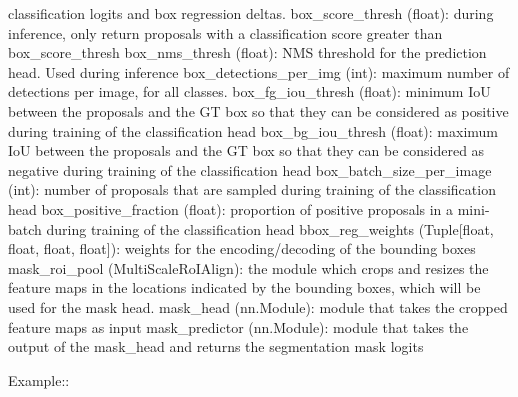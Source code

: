 \begin{DoxyVerb}
        classification logits and box regression deltas.
    box_score_thresh (float): during inference, only return proposals with a classification score
        greater than box_score_thresh
    box_nms_thresh (float): NMS threshold for the prediction head. Used during inference
    box_detections_per_img (int): maximum number of detections per image, for all classes.
    box_fg_iou_thresh (float): minimum IoU between the proposals and the GT box so that they can be
        considered as positive during training of the classification head
    box_bg_iou_thresh (float): maximum IoU between the proposals and the GT box so that they can be
        considered as negative during training of the classification head
    box_batch_size_per_image (int): number of proposals that are sampled during training of the
        classification head
    box_positive_fraction (float): proportion of positive proposals in a mini-batch during training
        of the classification head
    bbox_reg_weights (Tuple[float, float, float, float]): weights for the encoding/decoding of the
        bounding boxes
    mask_roi_pool (MultiScaleRoIAlign): the module which crops and resizes the feature maps in
         the locations indicated by the bounding boxes, which will be used for the mask head.
    mask_head (nn.Module): module that takes the cropped feature maps as input
    mask_predictor (nn.Module): module that takes the output of the mask_head and returns the
        segmentation mask logits

Example::


\end{DoxyVerb}
